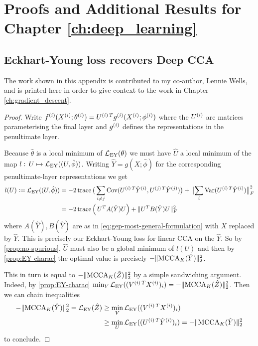 \chapter{Proofs and Additional Results for Chapter \ref{ch:deep_learning}}\label{app:deep_learning}
\section{Eckhart-Young loss recovers Deep CCA}\label{supp:EY-recover-Deep-CCA}
\recoverDeepCCA* %

The work shown in this appendix is contributed to my co-author, Lennie Wells, and is printed here in order to give context to the work in Chapter \ref{ch:gradient_descent}.

\begin{proof}
    Write $f\sps{i}(X\sps{i}; \theta\sps{i}) = U\spsT{i} g\sps{i}(X\sps{i}; \phi\sps{i})$ where the $U\sps{i}$ are matrices parameterising the final layer and $g\sps{i}$ defines the representations in the penultimate layer.

    Because $\hat{\theta}$ is a local minimum of $\LEY(\theta)$ we must have $\hat{U}$ a local minimum of the map $l: \, U \mapsto \LEY((U, \hat{\phi}))$. Writing $\hat{Y} = g(X; \hat{\phi})$ for the corresponding penultimate-layer representations we get
    \begin{align*}
        l(U) \defeq \LEY((U, \hat{\phi}))
        &= - 2 \tr \big(\sum_{i \neq j} \Cov(U\spsT{i} \hat{Y}\sps{i}, U\spsT{j} \hat{Y}\sps{j}) \big) + \norm[\big]{\sum_i \Var(U\spsT{i} \hat{Y}\sps{i})}_F^2 \\
        &= - 2 \tr \left( \,U^T A(\hat{Y}) U\right)  + \norm{U^T B(\hat{Y}) U}^2_F
    \end{align*}
    where $A(\hat{Y}), B(\hat{Y})$ are as in \cref{eq:gep-most-general-formulation} with $X$ replaced by $\hat{Y}$.
    This is precisely our Eckhart-Young loss for linear CCA on the $\hat{Y}$.
    So by \cref{prop:no-spurious}, $\hat{U}$ must also be a global minimum of $l(U)$ and then by \cref{prop:EY-charac} the optimal value is precisely $- \norm{\MCCA_K(\hat{Y})}_2^2$.

    This in turn is equal to $- \norm{\MCCA_K(\hat{Z})}_2^2$ by a simple sandwiching argument.
    Indeed, by \cref{prop:EY-charac} $\min_V \LEY((V\spsT{i} X\sps{i})_i) = - \norm{\MCCA_K(\hat{Z})}_2^2$.
    Then we can chain inequalities
    \begin{align*}
        - \norm{\MCCA_K(\hat{Y})}_2^2 = \LEY(\hat{Z})
        &\geq \min_V \LEY((V\spsT{i} X\sps{i})_i) \\
        &\geq \min_U \LEY((U\spsT{i} \hat{Y}\sps{i})_i) = - \norm{\MCCA_K(\hat{Y})}_2^2
    \end{align*}
    to conclude.
\end{proof}


